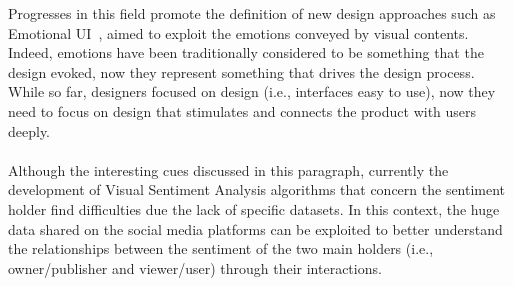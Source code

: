 Progresses in this field promote the definition of new design approaches such as Emotional UI~\cite{emoji2015w}, aimed to exploit the emotions conveyed by visual contents. Indeed, emotions have been traditionally considered to be something that the design evoked, now they represent something that drives the design process. While so far, designers focused on  design (i.e., interfaces easy to use), now they need to focus on design that stimulates and connects the product with users deeply.
%
%
%
\\
\\
Although the interesting cues discussed in this paragraph, currently the development of Visual Sentiment Analysis algorithms that concern the sentiment holder find difficulties due the lack of specific datasets. In this context, the huge data shared on the social media platforms can be exploited to better understand the relationships between the sentiment of the two main holders (i.e., owner/publisher and viewer/user) through their interactions.

